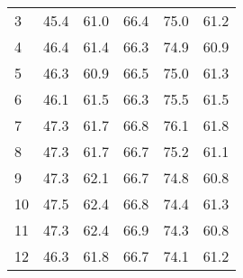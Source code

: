 \begin{tabular}{llllll}
\multicolumn{1}{l}{\hspace{3em}3} &
  \multicolumn{1}{|r}{45.4} &
  \multicolumn{1}{r}{61.0} &
  \multicolumn{1}{r}{66.4} &
  \multicolumn{1}{r}{75.0} &
  \multicolumn{1}{r}{61.2} \\
\multicolumn{1}{l}{\hspace{3em}4} &
  \multicolumn{1}{|r}{46.4} &
  \multicolumn{1}{r}{61.4} &
  \multicolumn{1}{r}{66.3} &
  \multicolumn{1}{r}{74.9} &
  \multicolumn{1}{r}{60.9} \\
\multicolumn{1}{l}{\hspace{3em}5} &
  \multicolumn{1}{|r}{46.3} &
  \multicolumn{1}{r}{60.9} &
  \multicolumn{1}{r}{66.5} &
  \multicolumn{1}{r}{75.0} &
  \multicolumn{1}{r}{61.3} \\
\multicolumn{1}{l}{\hspace{3em}6} &
  \multicolumn{1}{|r}{46.1} &
  \multicolumn{1}{r}{61.5} &
  \multicolumn{1}{r}{66.3} &
  \multicolumn{1}{r}{75.5} &
  \multicolumn{1}{r}{61.5} \\
\multicolumn{1}{l}{\hspace{3em}7} &
  \multicolumn{1}{|r}{47.3} &
  \multicolumn{1}{r}{61.7} &
  \multicolumn{1}{r}{66.8} &
  \multicolumn{1}{r}{76.1} &
  \multicolumn{1}{r}{61.8} \\
\multicolumn{1}{l}{\hspace{3em}8} &
  \multicolumn{1}{|r}{47.3} &
  \multicolumn{1}{r}{61.7} &
  \multicolumn{1}{r}{66.7} &
  \multicolumn{1}{r}{75.2} &
  \multicolumn{1}{r}{61.1} \\
\multicolumn{1}{l}{\hspace{3em}9} &
  \multicolumn{1}{|r}{47.3} &
  \multicolumn{1}{r}{62.1} &
  \multicolumn{1}{r}{66.7} &
  \multicolumn{1}{r}{74.8} &
  \multicolumn{1}{r}{60.8} \\
\multicolumn{1}{l}{\hspace{3em}10} &
  \multicolumn{1}{|r}{47.5} &
  \multicolumn{1}{r}{62.4} &
  \multicolumn{1}{r}{66.8} &
  \multicolumn{1}{r}{74.4} &
  \multicolumn{1}{r}{61.3} \\
\multicolumn{1}{l}{\hspace{3em}11} &
  \multicolumn{1}{|r}{47.3} &
  \multicolumn{1}{r}{62.4} &
  \multicolumn{1}{r}{66.9} &
  \multicolumn{1}{r}{74.3} &
  \multicolumn{1}{r}{60.8} \\
\multicolumn{1}{l}{\hspace{3em}12} &
  \multicolumn{1}{|r}{46.3} &
  \multicolumn{1}{r}{61.8} &
  \multicolumn{1}{r}{66.7} &
  \multicolumn{1}{r}{74.1} &
  \multicolumn{1}{r}{61.2} \\

\end{tabular}
